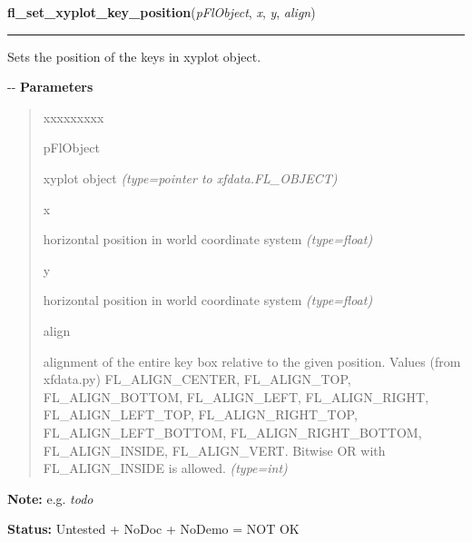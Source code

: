     \vspace{0.5ex}

\hspace{.8\funcindent}\begin{boxedminipage}{\funcwidth}

    \raggedright \textbf{fl\_set\_xyplot\_key\_position}(\textit{pFlObject}, \textit{x}, \textit{y}, \textit{align})

    \vspace{-1.5ex}

    \rule{\textwidth}{0.5\fboxrule}
\setlength{\parskip}{2ex}

Sets the position of the keys in xyplot object.

-{}-
\setlength{\parskip}{1ex}
      \textbf{Parameters}
      \vspace{-1ex}

      \begin{quote}
        \begin{Ventry}{xxxxxxxxx}

          \item[pFlObject]


xyplot object
            {\it (type=pointer to xfdata.FL\_OBJECT)}

          \item[x]


horizontal position in world coordinate system
            {\it (type=float)}

          \item[y]


horizontal position in world coordinate system
            {\it (type=float)}

          \item[align]


alignment of the entire key box relative to the given position. Values
(from xfdata.py) FL\_ALIGN\_CENTER, FL\_ALIGN\_TOP, FL\_ALIGN\_BOTTOM,
FL\_ALIGN\_LEFT, FL\_ALIGN\_RIGHT, FL\_ALIGN\_LEFT\_TOP, FL\_ALIGN\_RIGHT\_TOP,
FL\_ALIGN\_LEFT\_BOTTOM, FL\_ALIGN\_RIGHT\_BOTTOM, FL\_ALIGN\_INSIDE,
FL\_ALIGN\_VERT. Bitwise OR with FL\_ALIGN\_INSIDE is allowed.
            {\it (type=int)}

        \end{Ventry}

      \end{quote}

\textbf{Note:} 
e.g. \emph{todo}


\textbf{Status:} 
Untested + NoDoc + NoDemo = NOT OK


    \end{boxedminipage}

